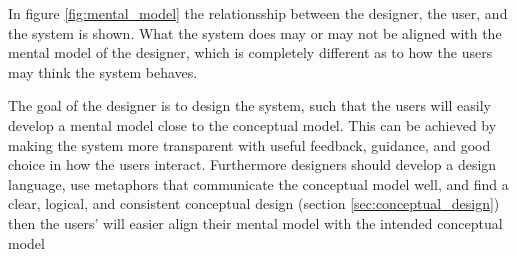 In figure \ref{fig:mental_model} the relationsship between the designer, the user, and the system is shown. What the system does may or may not be aligned with the mental model of the designer, which is completely different as to how the users may think the system behaves. \cite[p. 31]{benyon14} 



The goal of the designer is to design the system, such that the users will easily develop a mental model close to the conceptual model. This can be achieved by making the system more transparent with useful feedback, guidance, and good choice in how the users interact. Furthermore designers should develop a design language, use metaphors that communicate the conceptual model well, and find a clear, logical, and consistent conceptual design (section \ref{sec:conceptual_design}) then the users' will easier align their mental model with the intended conceptual model \cite[p. 86-88]{rogers} \cite[p. 32]{benyon14}
